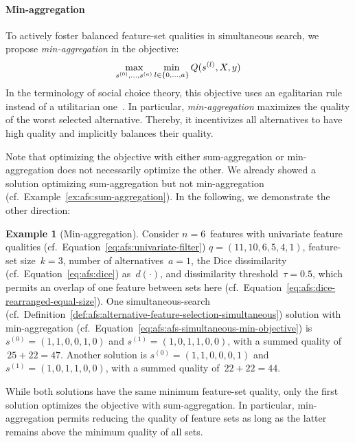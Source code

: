 \documentclass{article}
\theoremstyle{definition}
\newtheorem{example}{Example}
\begin{document}
\paragraph{Min-aggregation}

To actively foster balanced feature-set qualities in simultaneous search, we propose \emph{min-aggregation} in the objective:
%
\begin{equation}
	\max_{s^{(0)}, \dots, s^{(a)}} \min_{l \in \{0, \dots, a\}} Q(s^{(l)},X,y) \\
	\label{eq:afs:afs-simultaneous-min-objective}
\end{equation}
%
In the terminology of social choice theory, this objective uses an egalitarian rule instead of a utilitarian one~\cite{myerson1981utilitarianism}.
In particular, \emph{min-aggregation} maximizes the quality of the worst selected alternative.
Thereby, it incentivizes all alternatives to have high quality and implicitly balances their quality.

Note that optimizing the objective with either sum-aggregation or min-aggregation does not necessarily optimize the other.
We already showed a solution optimizing sum-aggregation but not min-aggregation (cf.~Example~\ref{ex:afs:sum-aggregation}).
In the following, we demonstrate the other direction:
%
\begin{example}[Min-aggregation]
Consider $n=6$~features with univariate feature qualities (cf.~Equation~\ref{eq:afs:univariate-filter}) $q = (11,10,6,5,4,1)$, feature-set size~$k=3$, number of alternatives~$a=1$, the Dice dissimilarity (cf.~Equation~\ref{eq:afs:dice}) as~$d(\cdot)$, and dissimilarity threshold~$\tau = 0.5$, which permits an overlap of one feature between sets here (cf.~Equation~\ref{eq:afs:dice-rearranged-equal-size}).
One simultaneous-search (cf.~Definition~\ref{def:afs:alternative-feature-selection-simultaneous}) solution with min-aggregation (cf.~Equation~\ref{eq:afs:afs-simultaneous-min-objective}) is $s^{(0)} = (1,1,0,0,1,0)$ and $s^{(1)} = (1,0,1,1,0,0)$, with a summed quality of $\,25+22=47$.
Another solution is $s^{(0)} = (1,1,0,0,0,1)$ and $s^{(1)} = (1,0,1,1,0,0)$, with a summed quality of $\,22+22=44$.
\label{ex:afs:min-aggregation}
\end{example}
%
While both solutions have the same minimum feature-set quality, only the first solution optimizes the objective with sum-aggregation.
In particular, min-aggregation permits reducing the quality of feature sets as long as the latter remains above the minimum quality of all sets.
\end{document}
